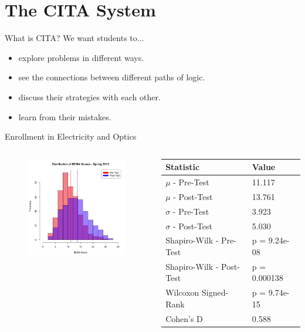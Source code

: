 \documentclass{beamer}
\begin{document}
\section{The CITA System}

\begin{frame}{What is CITA?}
  We want students to...
  \begin{itemize}
    \item explore problems in different ways.
    \item see the connections between different paths of logic.
    \item discuss their strategies with each other.
    \item learn from their mistakes.
  \end{itemize}
\end{frame}

\begin{frame}{Enrollment in Electricity and Optics}
\begin{columns}
\begin{column}{2in}
\begin{figure}
	\includegraphics[width=2in]{img/chapter4/bema_spring_2015}
\end{figure}
\end{column}
\begin{column}{2in}
\begin{scriptsize}
\begin{table}
  \centering
  \begin{tabular}{|l|l|}
    \hline
    \textbf{Statistic} & \textbf{Value}\\
	\hline
	$\mu$ - Pre-Test & 11.117 \\
	\hline
	$\mu$ - Post-Test & 13.761 \\
	\hline
	$\sigma$ - Pre-Test & 3.923 \\
	\hline
	$\sigma$ - Post-Test & 5.030 \\
	\hline
	Shapiro-Wilk - Pre-Test & p = 9.24e-08 \\
	\hline
	Shapiro-Wilk - Post-Test & p = 0.000138 \\
	\hline
	Wilcoxon Signed-Rank & p = 9.74e-15 \\
	\hline
	Cohen's D & 0.588 \\
	\hline
  \end{tabular}
\end{table}
\end{scriptsize}
\end{column}
\end{columns}
\end{frame}
\end{document}
